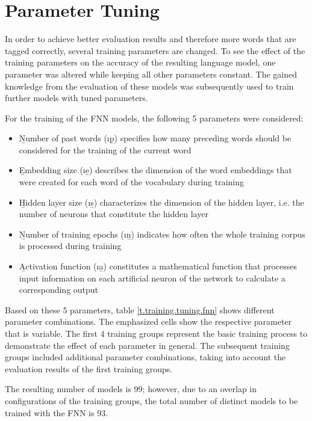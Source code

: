 \section{Parameter Tuning}\label{c.training.tuning}
In order to achieve better evaluation results and therefore more words that are tagged correctly, several training parameters are changed. To see the effect of the training parameters on the accuracy of the resulting language model, one parameter was altered while keeping all other parameters constant. The gained knowledge from the evaluation of these models was subsequently used to train further models with tuned parameters.

For the training of the FNN models, the following 5 parameters were considered:

\begin{itemize}
	\item \b{Number of past words} (\i{\b{p}}) specifies how many preceding words should be considered for the training of the current word
	\item \b{Embedding size} (\i{\b{e}}) describes the dimension of the word embeddings that were created for each word of the vocabulary during training
	\item \b{Hidden layer size} (\i{\b{s}}) characterizes the dimension of the hidden layer, i.e. the number of neurons that constitute the hidden layer
	\item \b{Number of training epochs} (\i{\b{n}}) indicates how often the whole training corpus is processed during training
	\item \b{Activation function} (\i{\b{a}}) constitutes a mathematical function that processes input information on each artificial neuron of the network to calculate a corresponding output
\end{itemize}

Based on these 5 parameters, table \ref{t.training.tuning.fnn} shows different parameter combinations. The emphasized cells show the respective parameter that is variable. The first 4 training groups represent the basic training process to demonstrate the effect of each parameter in general. The subsequent training groups included additional parameter combinations, taking into account the evaluation results of the first training groups.

The resulting number of models is 99; however, due to an overlap in configurations of the training groups, the total number of distinct models to be trained with the FNN is 93.

